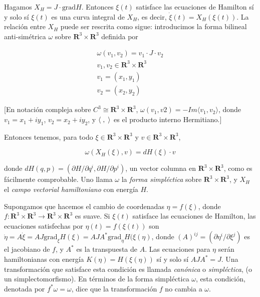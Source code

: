 \documentclass[a4paper,10pt]{article}
\numberwithin{equation}{section}
\newcommand{\grad}{\text{grad}}
\begin{document}
\vspace{.3cm}

Hagamos $X_H = J\cdot \grad H$. Entonces $\xi(t)$ satisface las ecuaciones de Hamilton
sí y solo sí $\xi(t)$ es una curva integral de $X_H$, es decir, $\dot{\xi}(t) = X_H(\xi(t))$. La 
relación entre $X_H$ puede ser rescrita como sigue: introducimos la forma bilineal anti-simétrica 
$\omega$ sobre $\mathbf{R}^3\times\mathbf{R}^3$ definida por 

\begin{align*}
 \omega(v_1,v_2) = v_1 \cdot J \cdot v_2 \\
 v_1, v_2 \in \mathbf{R}^3\times\mathbf{R}^3 \\
 v_1 = (x_1,y_1) \\
 v_2 = (x_2,y_2)
\end{align*}

[En notación compleja sobre $C^3 \cong \mathbf{R}^3\times\mathbf{R}^3$, 
$\omega(v_1,v2) = - Im\langle v_1, v_2 \rangle$, donde $v_1 = x_1 + i y_1$, 
$v_2 = x_2 + i y_2$, y $\langle \hspace{.1cm}, \hspace{.1cm} \rangle$ es el producto interno Hermitiano.]

\vspace{.3cm}

Entonces tenemos, para todo $\xi \in \mathbf{R}^3\times\mathbf{R}^3$ y $v \in \mathbf{R}^3\times\mathbf{R}^3$,

\begin{equation*}
 \omega (X_H(\xi), v) = dH(\xi)\cdot v
\end{equation*}

donde $dH(q,p) = (\partial H/\partial q^i, \partial H/\partial p^i)$, un vector 
columna en $\mathbf{R}^3\times\mathbf{R}^3$, como es fácilmente comprobable. Uno llama 
$\omega$ la \emph{forma simpléctica} sobre $\mathbf{R}^3\times\mathbf{R}^3$, y $X_H$ 
el \emph{campo vectorial hamiltoniano} con energía $H$.

\vspace{.3cm}

Supongamos que hacemos el cambio de coordenadas $\eta = f(\xi)$, donde $f: \mathbf{R}^3\times\mathbf{R}^3 
\rightarrow \mathbf{R}^3\times\mathbf{R}^3$ es suave. Si $\xi(t)$ satisface las ecuaciones 
de Hamilton, las ecuaciones satisfechas por $\eta(t) = f(\xi(t))$ son 
$\dot{\eta} = A\dot{\xi} = AJ\grad_\xi H(\xi) = AJA^*\grad_\eta H(\xi(\eta)$, donde 
$(A)^{ij} = (\partial \eta^i/\partial \xi^j)$ es el jacobiano de $f$, y $A^*$ es la 
transpuesta de $A$. Las ecuaciones para $\eta$ serán hamiltonianas con energía 
$K(\eta) = H(\xi(\eta))$ sí y solo sí $AJA^* = J$. Una transformación que satisface 
esta condición es llamada \emph{canónica} o \emph{simpléctica}, (o un simplectomorfismo).
En términos de la forma simpléctica $\omega$, esta condición, denotada por $f^*\omega = \omega$, 
dice que la transformación $f$ no cambia a $\omega$. 
\end{document}

